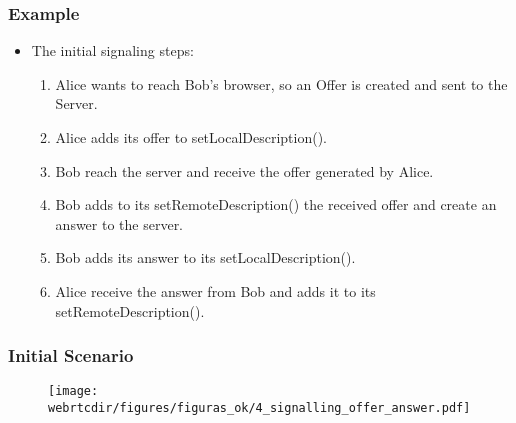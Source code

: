 \begin{frame}[fragile]\frametitle{Example}
\begin{itemize}
\item The initial signaling steps:
  \begin{enumerate}
  \item Alice wants to reach Bob's browser, so an Offer is created and sent to the Server.
  \item Alice adds its offer to setLocalDescription(). %
  \item Bob reach the server and receive the offer generated by Alice.
  \item Bob adds to its setRemoteDescription() the received offer and create an answer to the server.
  \item Bob adds its answer to its setLocalDescription().
  \item Alice receive the answer from Bob and adds it to its setRemoteDescription().
   \end{enumerate}
\end{itemize}
\end{frame}

\begin{frame}[fragile]\frametitle{Initial Scenario}
\begin{figure}
\texttt{[image: \\webrtcdir/figures/figuras\_ok/4\_signalling\_offer\_answer.pdf]}
\end{figure}
\end{frame}



